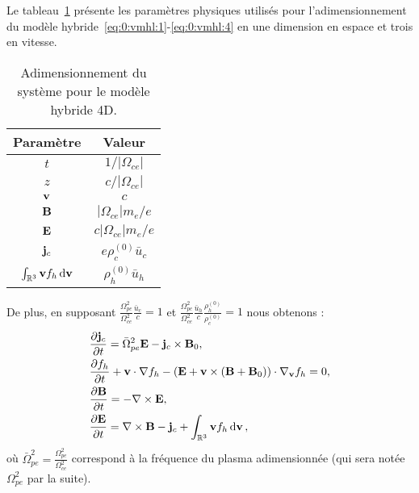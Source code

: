 Le tableau~\ref{dim4d} présente les paramètres physiques utilisés pour l'adimensionnement du modèle hybride~\eqref{eq:0:vmhl:1}-\eqref{eq:0:vmhl:4} en une dimension en espace et trois en vitesse.
\begin{table}[h]
  \centering
  \begin{tabular}{c|c}
    Paramètre & Valeur \\
    \hline
    $t$                                       & $1/|\Omega_{ce}|$         \\
    $z$                                       & $c/|\Omega_{ce}|$         \\ 
    $\vb{v}$                                  & $c$                       \\ 
    $\vb{B}$                                  & $|\Omega_{ce}|m_e/e$      \\ 
    $\vb{E}$                                  & $c |\Omega_{ce}|m_e/e$    \\ 
    $\vb{j}_c$                                & $e\rho_c^{(0)} \bar{u}_c$ \\ 
    $\int_{\mathbb{R}^3}\vb{v}f_h\dd{\vb{v}}$ & $\rho_h^{(0)} \bar{u}_h$  \\
  \end{tabular}
  \caption{Adimensionnement du système pour le modèle hybride 4D.}
  \label{dim4d}
\end{table}
De plus, en supposant $\frac{\Omega_{pe}^2}{\Omega_{ce}^2}\frac{\bar{u}_c}{c}=1$ et $\frac{\Omega_{pe}^2}{\Omega_{ce}^2}\frac{\bar{u}_h}{c}\frac{\rho_h^{(0)}}{\rho_c^{(0)}}=1$ nous obtenons :
\begin{align}
  \label{hybrid_model1_adim}
  &\frac{\partial \vb{j}_c}{\partial t} = \bar{\Omega}_{pe}^2 \vb{E} - \vb{j}_c \times \vb{B}_0,\\
  \label{hybrid_model2_adim}
  &\frac{\partial f_h}{\partial t} + {\mathbf v}\cdot \nabla f_h - \left(\vb{E} + {\mathbf v} \times ({\mathbf B }+ \vb{B}_0)\right)\cdot \nabla_{\mathbf v} f_h = 0,\\
  \label{hybrid_model3_adim}
  &\frac{\partial \vb{B}}{\partial t} = -\nabla \times \vb{E},\\
  \label{hybrid_model4_adim}
  & \frac{\partial \vb{E}}{\partial t} = \nabla \times \vb{B} - \vb{j}_c + \int_{\mathbb{R}^3} {\mathbf v}f_h \dd{\vb{v}},
\end{align}
où $\bar{\Omega}^2_{pe}=\frac{\Omega_{pe}^2}{\Omega_{ce}^2}$ correspond à la fréquence du plasma adimensionnée (qui sera notée $\Omega^2_{pe}$ par la suite).
